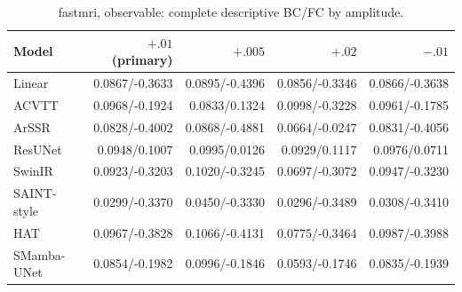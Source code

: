 \begin{table}[t]\centering\scriptsize

\caption{fastmri, observable: complete descriptive BC/FC by amplitude.}

\begin{tabular}{lrrrr}\toprule Model & $+.01$ (primary) & $+.005$ & $+.02$ & $-.01$\\\midrule

Linear & 0.0867/-0.3633 & 0.0895/-0.4396 & 0.0856/-0.3346 & 0.0866/-0.3638\\

ACVTT & 0.0968/-0.1924 & 0.0833/0.1324 & 0.0998/-0.3228 & 0.0961/-0.1785\\

ArSSR & 0.0828/-0.4002 & 0.0868/-0.4881 & 0.0664/-0.0247 & 0.0831/-0.4056\\

ResUNet & 0.0948/0.1007 & 0.0995/0.0126 & 0.0929/0.1117 & 0.0976/0.0711\\

SwinIR & 0.0923/-0.3203 & 0.1020/-0.3245 & 0.0697/-0.3072 & 0.0947/-0.3230\\

SAINT-style & 0.0299/-0.3370 & 0.0450/-0.3330 & 0.0296/-0.3489 & 0.0308/-0.3410\\

HAT & 0.0967/-0.3828 & 0.1066/-0.4131 & 0.0775/-0.3464 & 0.0987/-0.3988\\

SMamba-UNet & 0.0854/-0.1982 & 0.0996/-0.1846 & 0.0593/-0.1746 & 0.0835/-0.1939\\

\bottomrule\end{tabular}\end{table}

